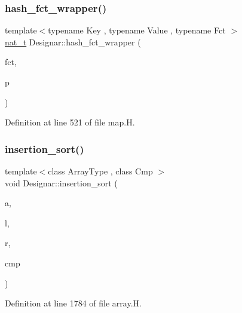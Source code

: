 \subsubsection{\texorpdfstring{hash\+\_\+fct\+\_\+wrapper()}{hash\_fct\_wrapper()}}
{\footnotesize\ttfamily template$<$typename Key , typename Value , typename Fct $>$ \\
\hyperlink{namespace_designar_aa72662848b9f4815e7bf31a7cf3e33d1}{nat\+\_\+t} Designar\+::hash\+\_\+fct\+\_\+wrapper (\begin{DoxyParamCaption}\item[{Fct}]{fct,  }\item[{const \hyperlink{namespace_designar_a7394b1b25278abf7211e77b91eb5204f}{Map\+Key}$<$ Key, Value $>$ \&}]{p }\end{DoxyParamCaption})\hspace{0.3cm}{\ttfamily [inline]}}



Definition at line 521 of file map.\+H.

\mbox{\label{namespace_designar_a9fec85a7dda46bb4840bf066c8483853}} 
\subsubsection{\texorpdfstring{insertion\+\_\+sort()}{insertion\_sort()}\hspace{0.1cm}{\footnotesize\ttfamily [1/6]}}
{\footnotesize\ttfamily template$<$class Array\+Type , class Cmp $>$ \\
void Designar\+::insertion\+\_\+sort (\begin{DoxyParamCaption}\item[{Array\+Type \&}]{a,  }\item[{\hyperlink{namespace_designar_a9d113d66a39e82b73727c72cd3a52f73}{lint\+\_\+t}}]{l,  }\item[{\hyperlink{namespace_designar_a9d113d66a39e82b73727c72cd3a52f73}{lint\+\_\+t}}]{r,  }\item[{Cmp \&}]{cmp }\end{DoxyParamCaption})}



Definition at line 1784 of file array.\+H.

\mbox{\label{namespace_designar_ab2f897d6db2113316fee5efcd50a459d}} 
